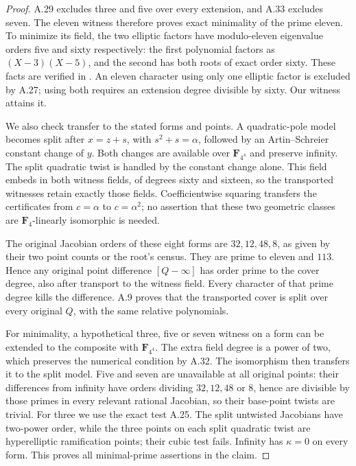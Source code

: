 \documentclass[11pt]{article}
\begin{document}
\begin{proof}
A.29 excludes three and five over every extension, and A.33
excludes seven. The eleven witness therefore proves exact minimality
of the prime eleven. To minimize its field, the two elliptic factors
have modulo-eleven eigenvalue orders five and sixty respectively:
the first polynomial factors as $(X-3)(X-5)$, and the second has
both roots of exact order sixty. These facts are verified in
.
An eleven character using only one elliptic factor is excluded by
A.27; using both requires an extension degree divisible by sixty.
Our witness attains it.

We also check transfer to the stated forms and points.
A quadratic-pole model becomes split after $x=z+s$, with
$s^2+s=\alpha$, followed by an Artin--Schreier constant change of
$y$. Both changes are available over $\mathbf F_{4^4}$ and preserve
infinity. The split quadratic twist is handled by the constant
change alone. This field embeds in both witness fields, of degrees
sixty and sixteen, so the transported witnesses retain exactly
those fields. Coefficientwise squaring transfers the certificates
from $c=\alpha$ to $c=\alpha^2$; no assertion that these two
geometric classes are $\mathbf F_4$-linearly isomorphic is needed.

The original Jacobian orders of these eight forms are $32,12,48,8$,
as given by their two point counts or the root's census. They are
prime to eleven and $113$. Hence any original point difference
$[Q-\infty]$ has order prime to the cover degree, also after transport
to the witness field. Every character of that prime degree kills
the difference. A.9 proves that the transported cover is split
over every original $Q$, with the same relative polynomials.

For minimality, a hypothetical three, five or seven witness on a
form can be extended to the composite with $\mathbf F_{4^4}$.
The extra field degree is a power of two, which preserves the
numerical condition by A.32. The isomorphism then transfers it
to the split model. Five and seven are unavailable at all original
points: their differences from infinity have orders dividing
$32,12,48$ or $8$, hence are divisible by those primes in every
relevant rational Jacobian, so their base-point twists are trivial.
For three we use the exact test A.25. The split untwisted
Jacobians have two-power order, while the three points on each
split quadratic twist are hyperelliptic ramification points;
their cubic test fails. Infinity has $\kappa=0$ on every form.
This proves all minimal-prime assertions in the claim.
\end{proof}
\end{document}
